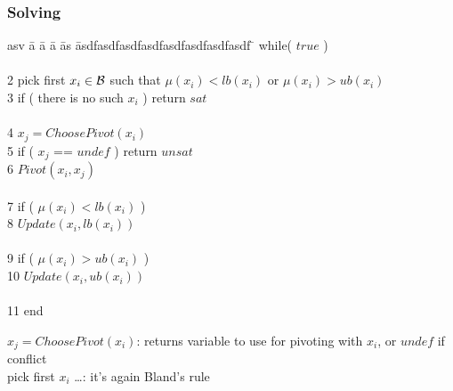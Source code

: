 \begin{frame}
  \frametitle{Solving}

  \scriptsize

  \begin{tabbing}
  asv \= a \= a \= a \= as \= asdfasdfasdfasdfasdfasdfasdfasdf \=   \> while( $true$ ) \\
     \> \\
  2  \> \> pick first $x_i \in \mathcal{B}$ such that $\mu(x_i) < lb(x_i)$ or $\mu(x_i) > ub(x_i)$ \\
  3  \> \> if ( there is no such $x_i$ ) return $sat$ \\
     \> \\
  4  \> \> $x_j = ChoosePivot( x_i )$ \\
  5  \> \> if ( $x_j$ == $undef$ ) return $unsat$ \\ 
  6  \> \> $Pivot(x_i,x_j)$ \\
     \> \\
  7  \> \> if ( $\mu(x_i) < lb(x_i)$ ) \\
  8  \> \> \> $Update( x_i, lb(x_i) )$ \\
     \> \\
  9  \> \> if ( $\mu(x_i) > ub(x_i)$ ) \\
  10 \> \> \> $Update( x_i, ub(x_i) )$ \\
     \> \\
  11 \> end
  \end{tabbing}

  $x_j = ChoosePivot( x_i )$: returns variable to use for pivoting with $x_i$, or $undef$ if conflict\\
  pick first $x_i$ \ldots: it's again Bland's rule

\end{frame}
